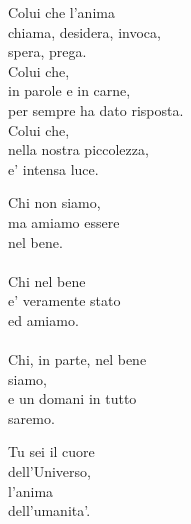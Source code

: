 \begin{haiku}
    Colui che l'anima\\
    chiama, desidera, invoca,\\
    spera, prega.\\
    Colui che,\\
    in parole e in carne,\\
    per sempre ha dato risposta.\\
    Colui che,\\
    nella nostra piccolezza,\\
    e' intensa luce.\\
\end{haiku}


\begin{haiku}
    Chi non siamo,\\
    ma amiamo essere\\
    nel bene.\\
    \leavevmode\\
    Chi nel bene\\
    e' veramente stato\\
    ed amiamo.\\
    \leavevmode\\
    Chi, in parte, nel bene\\
    siamo,\\
    e un domani in tutto\\
    saremo.\\
\end{haiku}


\begin{haiku}
	Tu sei il cuore \\
    dell'Universo,\\
	l'anima \\
    dell'umanita'.\\
\end{haiku}


